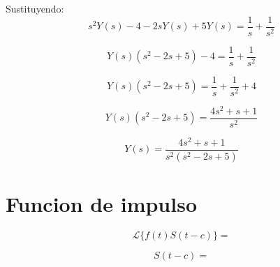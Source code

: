 \documentclass{article}
\begin{document}
Sustituyendo:
\[
    s^2Y(s) - 4 - 2sY(s) + 5Y(s) = \frac{1}{s} + \frac{1}{s^2}
\]

\[
    Y(s)(s^2 - 2s + 5) - 4 = \frac{1}{s} + \frac{1}{s^2}
\]

\[
    Y(s)(s^2 - 2s + 5) = \frac{1}{s} + \frac{1}{s^2} + 4
\]

\[
    Y(s)(s^2 - 2s + 5) = \frac{4s^2+s+1}{s^2}
\]

\[
    Y(s) = \frac{4s^2+s+1}{s^2(s^2 - 2s + 5)}
\]

\newpage

\section{Funcion de impulso}

\[
    \mathcal{L}\{f(t) S(t-c)\} =
\]

\[
    S(t-c) =
\]
\end{document}
